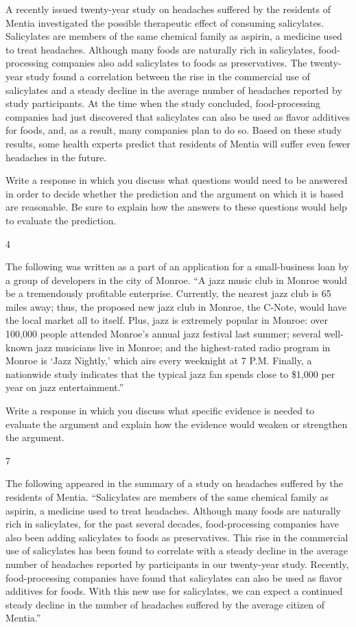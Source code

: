 \documentclass[]{article}
\begin{document}
A recently issued twenty-year study on headaches suffered by the
residents of Mentia investigated the possible therapeutic effect of
consuming salicylates. Salicylates are members of the same chemical
family as aspirin, a medicine used to treat headaches. Although many
foods are naturally rich in salicylates, food-processing companies also
add salicylates to foods as preservatives. The twenty-year study found a
correlation between the rise in the commercial use of salicylates and a
steady decline in the average number of headaches reported by study
participants. At the time when the study concluded, food-processing
companies had just discovered that salicylates can also be used as
flavor additives for foods, and, as a result, many companies plan to do
so. Based on these study results, some health experts predict that
residents of Mentia will suffer even fewer headaches in the future.

Write a response in which you discuss what questions would need to be
answered in order to decide whether the prediction and the argument on
which it is based are reasonable. Be sure to explain how the answers to
these questions would help to evaluate the prediction.

4

The following was written as a part of an application for a
small-business loan by a group of developers in the city of Monroe. ``A
jazz music club in Monroe would be a tremendously profitable enterprise.
Currently, the nearest jazz club is 65 miles away; thus, the proposed
new jazz club in Monroe, the C-Note, would have the local market all to
itself. Plus, jazz is extremely popular in Monroe: over 100,000 people
attended Monroe's annual jazz festival last summer; several well-known
jazz musicians live in Monroe; and the highest-rated radio program in
Monroe is `Jazz Nightly,' which airs every weeknight at 7 P.M. Finally,
a nationwide study indicates that the typical jazz fan spends close to
\$1,000 per year on jazz entertainment.''

Write a response in which you discuss what specific evidence is needed
to evaluate the argument and explain how the evidence would weaken or
strengthen the argument.

7

The following appeared in the summary of a study on headaches suffered
by the residents of Mentia. ``Salicylates are members of the same
chemical family as aspirin, a medicine used to treat headaches. Although
many foods are naturally rich in salicylates, for the past several
decades, food-processing companies have also been adding salicylates to
foods as preservatives. This rise in the commercial use of salicylates
has been found to correlate with a steady decline in the average number
of headaches reported by participants in our twenty-year study.
Recently, food-processing companies have found that salicylates can also
be used as flavor additives for foods. With this new use for
salicylates, we can expect a continued steady decline in the number of
headaches suffered by the average citizen of Mentia.''
\end{document}
